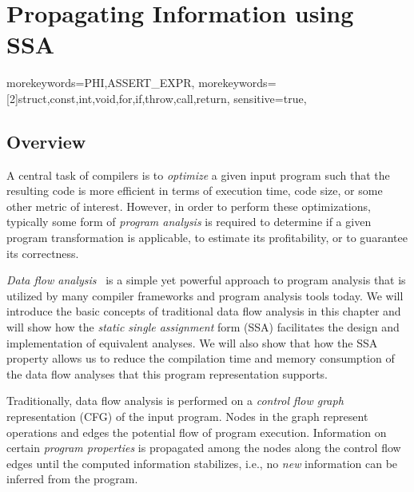 \providecommand\lcode{\begingroup \small\urlstyle{tt}\Url}
\providecommand\lident{\begingroup \small\urlstyle{tt}\Url}

\chapter{Propagating Information using SSA}
\label{chapter:constant_propagation_is_easier}
\newcommand{\obacht}[2]{\marginpar{\tiny\textbf{#1:} #2}}

\graphicspath{{img/}{constant_propagation_is_easier/img/}{part3/constant_propagation_is_easier/img/}}

{
  morekeywords={PHI,ASSERT_EXPR},
  morekeywords=[2]{struct,const,int,void,for,if,throw,call,return},
  sensitive=true,
}

\lstset{
  mathescape=true,
  language=DNlisting,
  basicstyle=\small,
  keywordstyle=\ttfamily,
  keywordstyle=[2]\bfseries,
  numbers=left
}

\section{Overview}

A central task of compilers is to \emph{optimize} a given input program such
that the resulting code is more efficient in terms of execution time, code size,
or some other metric of interest. However, in order to perform these
optimizations, typically some form of \emph{program analysis} is
required to determine if a given program transformation is applicable, to
estimate its profitability, or to guarantee its correctness.

\emph{Data flow analysis}~\cite{novillo:bib:NNH99} is a simple yet powerful
approach to program analysis that is utilized by many compiler frameworks and
program analysis tools today. We will introduce the basic concepts of
traditional data flow analysis in this chapter and will show how the \emph{static
single assignment} form (SSA) facilitates the design and implementation of
equivalent analyses.
We will also show that how the SSA property allows us to reduce the compilation
time and memory consumption of the data flow analyses that this program
representation supports.

Traditionally, data flow analysis is performed on a \emph{control flow graph}
representation (CFG) of the input program. Nodes in the graph represent
operations and edges the potential flow of program execution.
Information on certain \emph{program properties} is propagated among
the nodes along the control flow edges until the computed information
stabilizes, i.e., no \emph{new} information can be inferred from the program.

